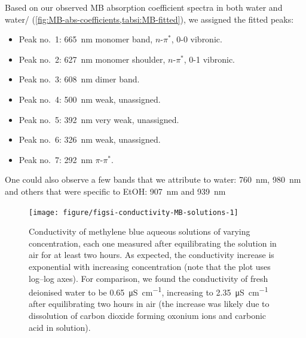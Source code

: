 \documentclass[9pt,twoside,twocolumn]{article}\usepackage{knitr}
\begin{document}
\begin{refsection}
Based on our observed MB absorption coefficient spectra in both water and water/ 
(\cref{fig:MB-abs-coefficients,tabsi:MB-fitted}), we assigned the fitted peaks:
\begin{itemize}[itemsep=0pt]
\item Peak no.\ 1: \qty{665}{\nm} monomer band, $n$-$\pi^\ast$, 0-0 vibronic.\\
\item Peak no.\ 2: \qty{627}{\nm} monomer shoulder, $n$-$\pi^\ast$, 0-1 vibronic.\\
\item Peak no.\ 3: \qty{608}{\nm} dimer band.\\
\item Peak no.\ 4: \qty{500}{\nm} weak, unassigned.\\
\item Peak no.\ 5: \qty{392}{\nm} very weak, unassigned.\\
\item Peak no.\ 6: \qty{326}{\nm} weak, unassigned.\\
\item Peak no.\ 7: \qty{292}{\nm} $\pi$-$\pi^\ast$.
\end{itemize}

One could also observe a few bands that we attribute to water: \qty{760}{\nm}, \qty{980}{\nm}
and others that were specific to EtOH: \qty{907}{\nm} and \qty{939}{\nm}


\begin{figure}[tbp]
\centering
\begin{knitrout}\footnotesize
{}\color{fgcolor}

{\centering \texttt{[image: figure/figsi-conductivity-MB-solutions-1]} 

}


\end{knitrout}
\caption{Conductivity of methylene blue aqueous solutions of varying concentration, each one measured after equilibrating the solution in air for at least two hours.
As expected, the conductivity increase is exponential with increasing concentration (note that the plot uses log--log axes).
For comparison, we found the conductivity of fresh deionised water to be \qty{0.65}{\micro\siemens\per\cm}, increasing to \qty{2.35}{\micro\siemens\per\cm} after equilibrating two hours in air (the increase was likely due to dissolution of carbon dioxide forming oxonium ions and carbonic acid in solution).
}\label{figsi:conductivity-MB-solutions}
\end{figure}




\end{refsection}
\end{document}
